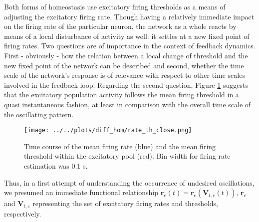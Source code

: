\documentclass[10pt,a4paper]{article}
\begin{document}
Both forms of homeostasis use excitatory firing thresholds as a means of adjusting the excitatory firing rate. Though having a relatively immediate impact on the firing rate of the particular neuron, the network as a whole reacts by means of a local disturbance of activity as well: it settles at a new fixed point of firing rates. Two questions are of importance in the context of feedback dynamics. First - obviously - how the relation between a local change of threshold and the new fixed point of the network can be described and second, whether the time scale of the network's response is of relevance with respect to other time scales involved in the feedback loop. Regarding the second question, Figure \ref{rate_th_close} suggests that the excitatory population activity follows the mean firing threshold in a quasi instantaneous fashion, at least in comparison with the overall time scale of the oscillating pattern.
\begin{figure}
\begin{center}
\texttt{[image: ../../plots/diff\_hom/rate\_th\_close.png]}
\end{center}
\caption{Time course of the mean firing rate (blue) and the mean firing threshold within the excitatory pool (red). Bin width for firing rate estimation was 0.1 s.}
\label{rate_th_close}
\end{figure}
Thus, in a first attempt of understanding the occurrence of undesired oscillations, we presumed an immediate functional relationship $\mathbf{r}_e (t) = \mathbf{r}_e (\mathbf{V}_{t,e} (t))$, $\mathbf{r}_e$ and $\mathbf{V}_{t,e}$ representing the set of excitatory firing rates and thresholds, respectively.
\end{document}
